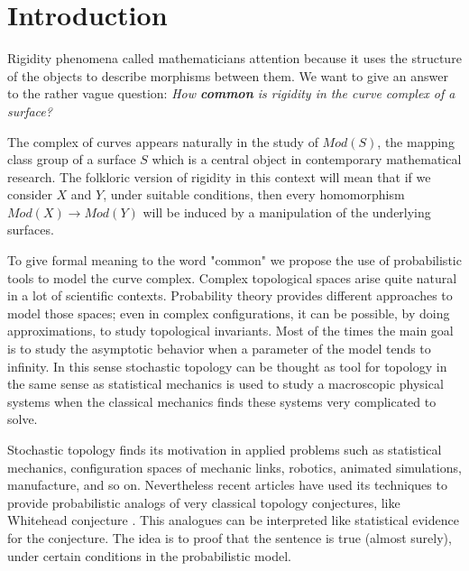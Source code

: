 \chapter*{Introduction} %

\label{Intro} %



Rigidity phenomena called mathematicians attention because it uses the structure of the objects to describe morphisms between them. We want to give an answer to the rather vague question: \textit{How \textbf{common} is rigidity in the curve complex of a surface?}

The complex of curves appears naturally in the study of $Mod(S)$, the mapping class group of a surface $S$ which is a central object in contemporary mathematical research. The folkloric version of rigidity in this context will mean that if we consider $X$ and $Y$, under suitable conditions, then every homomorphism $Mod(X) \to Mod(Y)$ will be induced by a manipulation of the underlying surfaces.

To give formal meaning to the word "common" we propose the use of probabilistic tools to model the curve complex. Complex topological spaces arise quite natural in a lot of scientific contexts. Probability theory provides different approaches to model those spaces; even in complex configurations, it can be possible, by doing approximations, to study topological invariants. Most of the times the main goal is to study the asymptotic behavior when a parameter of the model tends to infinity. In this sense stochastic topology can be thought as tool for topology in the same sense as statistical mechanics is used to study a macroscopic physical systems when the classical mechanics finds these systems very complicated to solve.

Stochastic topology finds its motivation in applied problems such as statistical mechanics, configuration spaces of mechanic links, robotics, animated simulations, manufacture, and so on. Nevertheless recent articles have used its techniques to provide probabilistic analogs of very classical topology conjectures, like Whitehead conjecture \cite{Costa15}. This analogues can be interpreted like statistical evidence for the conjecture. The idea is to proof that the sentence is true (almost surely), under certain conditions in the probabilistic model.

